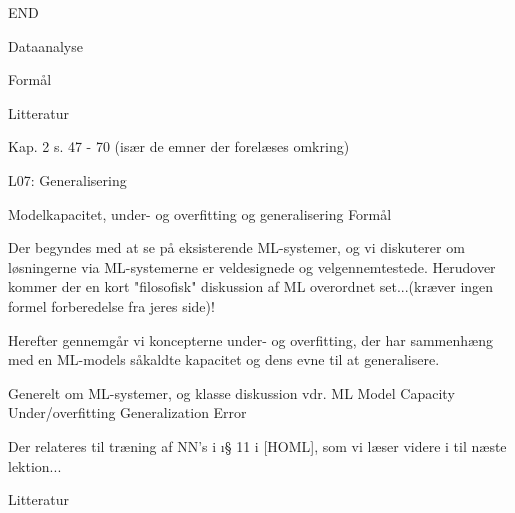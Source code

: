 








END


Dataanalyse

Formål


Litteratur

Kap. 2  s. 47 - 70 (især de emner der forelæses omkring) 




L07: Generalisering 

Modelkapacitet, under- og overfitting og generalisering
Formål

Der begyndes med at se på eksisterende ML-systemer, og vi diskuterer om
løsningerne via ML-systemerne er veldesignede og velgennemtestede.  Herudover
kommer der en kort "filosofisk" diskussion af ML overordnet set...(kræver ingen
formel forberedelse fra jeres side)!

Herefter gennemgår vi koncepterne under- og overfitting, der har sammenhæng med
en ML-models såkaldte kapacitet og dens evne til at generalisere.

    Generelt om ML-systemer, og klasse diskussion vdr. ML
    Model Capacity
    Under/overfitting
    Generalization Error

Der relateres til træning af NN's i \i{§ 11} i [HOML], som vi læser videre i til
næste lektion...  

Litteratur

